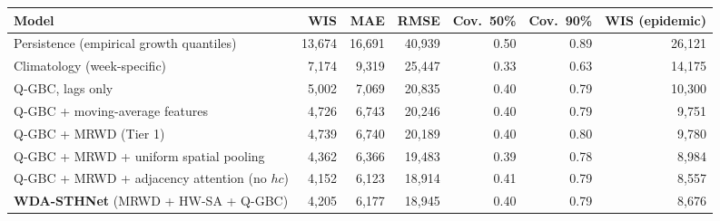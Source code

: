 \begin{tabular}{lrrrrrr}
\toprule
Model & WIS & MAE & RMSE & Cov.\ 50\% & Cov.\ 90\% & WIS (epidemic) \\
\midrule
Persistence (empirical growth quantiles) & 13,674 & 16,691 & 40,939 & 0.50 & 0.89 & 26,121 \\
Climatology (week-specific) & 7,174 & 9,319 & 25,447 & 0.33 & 0.63 & 14,175 \\
\midrule
Q-GBC, lags only & 5,002 & 7,069 & 20,835 & 0.40 & 0.79 & 10,300 \\
Q-GBC + moving-average features & 4,726 & 6,743 & 20,246 & 0.40 & 0.79 & 9,751 \\
Q-GBC + MRWD (Tier 1) & 4,739 & 6,740 & 20,189 & 0.40 & 0.80 & 9,780 \\
Q-GBC + MRWD + uniform spatial pooling & 4,362 & 6,366 & 19,483 & 0.39 & 0.78 & 8,984 \\
Q-GBC + MRWD + adjacency attention (no $hc$) & 4,152 & 6,123 & 18,914 & 0.41 & 0.79 & 8,557 \\
\textbf{WDA-STHNet} (MRWD + HW-SA + Q-GBC) & 4,205 & 6,177 & 18,945 & 0.40 & 0.79 & 8,676 \\
\bottomrule
\end{tabular}

